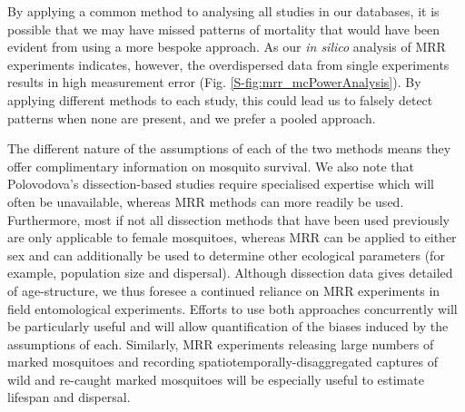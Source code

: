 \documentclass[]{article}
\begin{document}
By applying a common method to analysing all studies in our databases,
it is possible that we may have missed patterns of mortality that would
have been evident from using a more bespoke approach. As our \emph{in
silico} analysis of MRR experiments indicates, however, the
overdispersed data from single experiments results in high measurement
error (Fig. \ref{S-fig:mrr_mcPowerAnalysis}). By applying different methods to each study, this
could lead us to falsely detect patterns when none are present, and we
prefer a pooled approach.

The different nature of the assumptions of each of the two methods means
they offer complimentary information on mosquito survival. We also note
that Polovodova's dissection-based studies require specialised expertise
which will often be unavailable, whereas MRR methods can more readily be
used. Furthermore, most if not all dissection methods that have been
used previously are only applicable to female mosquitoes, whereas MRR
can be applied to either sex and can additionally be used to determine
other ecological parameters (for example, population size and
dispersal). Although dissection data gives detailed of age-structure, we
thus foresee a continued reliance on MRR experiments in field
entomological experiments. Efforts to use both approaches concurrently
will be particularly useful and will allow quantification of the biases
induced by the assumptions of each. Similarly, MRR experiments releasing
large numbers of marked mosquitoes and recording
spatiotemporally-disaggregated captures of wild and re-caught marked
mosquitoes will be especially useful to estimate lifespan and dispersal.
\end{document}
